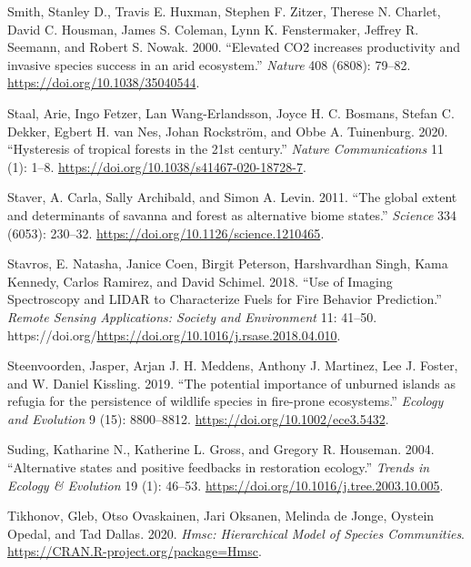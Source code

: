 \documentclass[
  12pt,
]{article}
\newlength{\cslhangindent}
\newlength{\cslentryspacingunit} %
\newenvironment{CSLReferences}[2] %
 {%
  \setlength{\parindent}{0pt}
  \ifodd #1
  \let\oldpar\par
  \def\par{\hangindent=\cslhangindent\oldpar}
  \fi
  \setlength{\parskip}{#2\cslentryspacingunit}
 }%
 {}
\begin{document}
\begin{CSLReferences}{1}{0}
\leavevmode{}%
Smith, Stanley D., Travis E. Huxman, Stephen F. Zitzer, Therese N.
Charlet, David C. Housman, James S. Coleman, Lynn K. Fenstermaker,
Jeffrey R. Seemann, and Robert S. Nowak. 2000. {``{Elevated CO2
increases productivity and invasive species success in an arid
ecosystem}.''} \emph{Nature} 408 (6808): 79--82.
\url{https://doi.org/10.1038/35040544}.

\leavevmode{}%
Staal, Arie, Ingo Fetzer, Lan Wang-Erlandsson, Joyce H. C. Bosmans,
Stefan C. Dekker, Egbert H. van Nes, Johan Rockström, and Obbe A.
Tuinenburg. 2020. {``{Hysteresis of tropical forests in the 21st
century}.''} \emph{Nature Communications} 11 (1): 1--8.
\url{https://doi.org/10.1038/s41467-020-18728-7}.

\leavevmode{}%
Staver, A. Carla, Sally Archibald, and Simon A. Levin. 2011. {``{The
global extent and determinants of savanna and forest as alternative
biome states}.''} \emph{Science} 334 (6053): 230--32.
\url{https://doi.org/10.1126/science.1210465}.

\leavevmode{}%
Stavros, E. Natasha, Janice Coen, Birgit Peterson, Harshvardhan Singh,
Kama Kennedy, Carlos Ramirez, and David Schimel. 2018. {``Use of Imaging
Spectroscopy and {LIDAR} to Characterize Fuels for Fire Behavior
Prediction.''} \emph{Remote Sensing Applications: Society and
Environment} 11: 41--50.
https://doi.org/\url{https://doi.org/10.1016/j.rsase.2018.04.010}.

\leavevmode{}%
Steenvoorden, Jasper, Arjan J. H. Meddens, Anthony J. Martinez, Lee J.
Foster, and W. Daniel Kissling. 2019. {``{The potential importance of
unburned islands as refugia for the persistence of wildlife species in
fire-prone ecosystems}.''} \emph{Ecology and Evolution} 9 (15):
8800--8812. \url{https://doi.org/10.1002/ece3.5432}.

\leavevmode{}%
Suding, Katharine N., Katherine L. Gross, and Gregory R. Houseman. 2004.
{``{Alternative states and positive feedbacks in restoration
ecology}.''} \emph{Trends in Ecology \& Evolution} 19 (1): 46--53.
\url{https://doi.org/10.1016/j.tree.2003.10.005}.

\leavevmode{}%
Tikhonov, Gleb, Otso Ovaskainen, Jari Oksanen, Melinda de Jonge, Oystein
Opedal, and Tad Dallas. 2020. \emph{Hmsc: Hierarchical Model of Species
Communities}. \url{https://CRAN.R-project.org/package=Hmsc}.


\end{CSLReferences}
\end{document}
